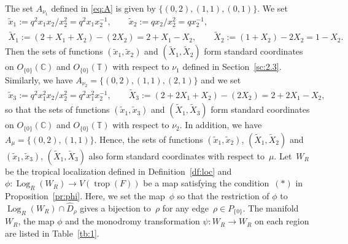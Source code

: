 \documentclass[pdftex]{sigma}
\numberwithin{equation}{section}
\begin{document}
The set $A_{\nu_1}$ def\/ined in \eqref{eq:A} is given by $\{ (0,2), (1,1), (0,1) \}$. We set
\begin{gather*}
\tilde{x}_1 := q^2x_1x_2/ x_2^2=q^2x_1x_2^{-1}, \qquad \tilde{x}_2:= qx_2/x_2^2=qx_2^{-1}, \\
\widetilde{X}_1 := (2+X_1+X_2)-(2X_2)=2+X_1-X_2, \qquad \widetilde{X}_2:=(1+X_2)-2X_2=1-X_2.
\end{gather*}
Then the sets of functions $(\tilde{x}_1, \tilde{x}_2)$ and $(\widetilde{X}_1, \widetilde{X}_2)$ form standard coordinates on $O_{\{0\}}({\mathbb C})$ and $O_{\{0\}}({\mathbb T})$ with respect to $\nu_1$ def\/ined in Section~\ref{sc:2.3}. Similarly, we have $A_{\nu_2}=\{(0,2), (1,1), (2,1) \}$ and we set
\begin{gather*}
\tilde{x}_3:= q^2x_1^2x_2/x_2^2=q^2x_1^2x_2^{-1}, \qquad \widetilde{X}_3:=(2+2X_1+X_2)-(2X_2)=2+2X_1-X_2,
\end{gather*}
so that the sets of functions $(\tilde{x}_1, \tilde{x}_3)$ and $(\widetilde{X}_1, \widetilde{X}_3)$ form standard coordinates on $O_{\{0\}}({\mathbb C})$ and $O_{\{0\}}({\mathbb T})$ with respect to $\nu_2$. In addition, we have $A_{\mu}=\{ (0,2), (1,1) \}$. Hence, the sets of functions $(\tilde{x}_1, \tilde{x}_2)$, $(\widetilde{X}_1, \widetilde{X}_2)$ and $(\tilde{x}_1, \tilde{x}_3)$, $(\widetilde{X}_1, \widetilde{X}_3)$ also form standard coordinates with respect to~$\mu$. Let~$W_R$ be the tropical localization def\/ined in Def\/inition~\ref{df:loc} and $\phi \colon \operatorname{Log}_R(W_R) \to V(\operatorname{trop}(F))$ be a map satisfying the condition~$(\ast)$ in Proposition~\ref{pr:phi}. Here, we set the map~$\phi$ so that the restriction of $\phi$ to $\operatorname{Log}_R(W_R) \cap \widehat{D}_\rho$ gives a bijection to~$\rho$ for any edge~$\rho \in P_{\{0\}}$. The manifold $W_R$, the map $\phi$ and the monodromy transformation $\psi \colon W_R \to W_R$ on each region are listed in Table~\ref{tb:1}.
\end{document}
